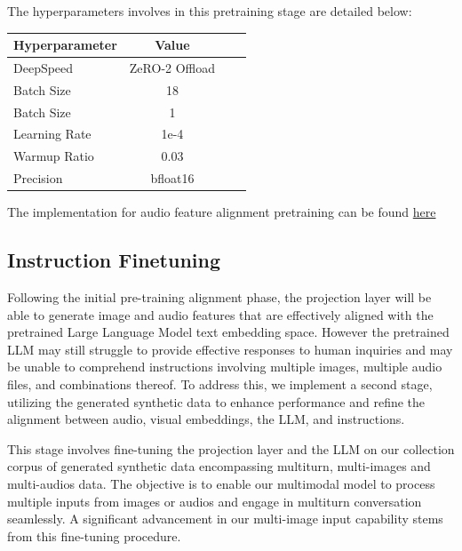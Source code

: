 \documentclass[preprint]{article}
\begin{document}
The hyperparameters involves in this pretraining stage are detailed below:

\begin{table}[h]
  \centering
  \begin{tabular}{lccl}
    \hline
    \textbf{Hyperparameter} & \textbf{Value} \\
    \hline
    DeepSpeed               & ZeRO-2 Offload \\
    Batch Size              & 18             \\
    Batch Size              & 1              \\
    Learning Rate           & 1e-4           \\
    Warmup Ratio            & 0.03           \\
    Precision               & bfloat16       \\
    \hline
  \end{tabular}
\end{table}

The implementation for audio feature alignment pretraining can be found \href{https://github.com/mesolitica/multimodal-LLM/tree/master/audio-only}{here}

\subsection{Instruction Finetuning}

Following the initial pre-training alignment phase, the projection layer will be able to generate image and audio features that are effectively aligned with the pretrained Large Language Model text embedding space. However the pretrained LLM may still struggle to provide effective responses to human inquiries and may be unable to comprehend instructions involving multiple images, multiple audio files, and combinations thereof. To address this, we implement a second stage, utilizing the generated synthetic data to enhance performance and refine the alignment between audio, visual embeddings, the LLM, and instructions.

This stage involves fine-tuning the projection layer and the LLM on our collection corpus of generated synthetic data encompassing multiturn, multi-images and multi-audios data. The objective is to enable our multimodal model to process multiple inputs from images or audios and engage in multiturn conversation seamlessly. A significant advancement in our multi-image input capability stems from this fine-tuning procedure.
\end{document}

